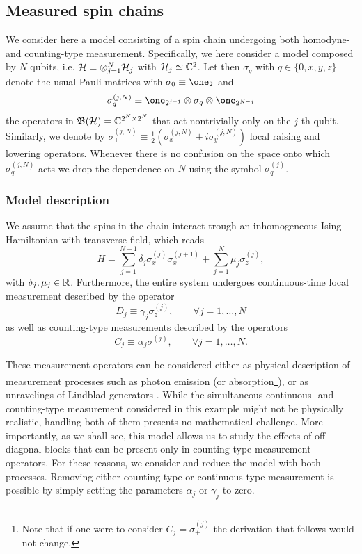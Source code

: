 \documentclass[aihp,12pt]{imsart}
\begin{document}
\subsection{Measured spin chains}
\label{sec:measured_spin_chains}
We  consider here a model consisting of a spin chain undergoing both homodyne- and counting-type measurement. 
Specifically, we here consider a model composed by $N$ qubits, i.e. $\mathcal{H}= \otimes_{j=1}^N \mathcal{H}_j$ with $\mathcal{H}_j \simeq \mathbb{C}^2$. Let then $\sigma_q$ with $q\in\{0,x,y,z\}$ denote the usual Pauli matrices with $\sigma_0\equiv\one_2$ and \[\sigma_q^{(j,N)} \equiv \one_{2^{j-1}} \otimes \sigma_q \otimes \one_{2^{N-j}}\] the operators in $\mathfrak{B}(\mathcal{H}) = \mathbb{C}^{2^{N}\times 2^N}$ that act nontrivially only on the $j$-th qubit. Similarly, we denote by $\sigma_\pm^{(j,N)}\equiv \frac{1}{2}\left(\sigma_x^{(j,N)}\pm i\sigma_y^{(j,N)}\right)$ local raising and lowering operators. Whenever there is no confusion on the space onto which $\sigma_q^{(j,N)}$ acts we drop the dependence on $N$ using the symbol $\sigma_q^{(j)}$. 

\subsubsection{Model description}
We assume that the spins in the chain interact trough an inhomogeneous Ising Hamiltonian with transverse field, which reads 
\begin{equation}
    H = \sum_{j=1}^{N-1} \delta_j \sigma_x^{(j)}\sigma_x^{(j+1)} + \sum_{j=1}^N \mu_j \sigma_z^{(j)},
\end{equation}
with $\delta_j,\mu_j\in\mathbb{R}$.
Furthermore, the entire system undergoes continuous-time local measurement described by the operator
\[ D_j \equiv \gamma_j \sigma_z^{(j)}, \qquad \forall j = 1,\dots, N\]
as well as counting-type measurements described by the operators
\[ C_j \equiv \alpha_j \sigma_-^{(j)}, \qquad \forall j=1,\dots,N.\]

These measurement operators can be considered either as physical description of measurement processes such as photon emission (or absorption\footnote{Note that if one were to consider $C_j=\sigma_+^{(j)}$ the derivation that follows would not change.}), or as unravelings of Lindblad generators \cite{PhysRevB.105.064305,turkeshi_measurement-induced_2021}. 
While the simultaneous continuous- and counting-type measurement considered in this example might not be physically realistic, handling both of them presents no mathematical challenge.
More importantly, as we shall see, this model allows us to study the effects of off-diagonal blocks that can be present only in counting-type measurement operators. For these reasons, we consider and reduce the model with both processes. Removing either counting-type or continuous type measurement is possible by simply setting the parameters $\alpha_j$ or $\gamma_j$ to zero. 
\end{document}
